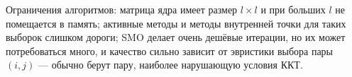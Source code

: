 \begin{idea}
Ограничения алгоритмов: матрица ядра имеет размер $l \times l$ и при больших
$l$ не помещается в память; активные методы и методы внутренней точки для
таких выборок слишком дороги; SMO делает очень дешёвые итерации, но их может
потребоваться много, и качество сильно зависит от эвристики выбора пары
$(i,j)$ — обычно берут пару, наиболее нарушающую условия ККТ.
\end{idea}

